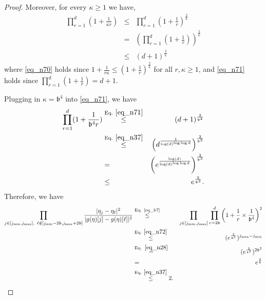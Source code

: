 \documentclass[11pt,letterpaper]{article}
\begin{document}
\begin{proof}
Moreover, for every $\kappa \geq 1$ we have,
%
\begin{eqnarray}
\prod_{r=1}^{d}   (1+ \frac{1}{\kappa r}) &\leq& \prod_{r=1}^{d}   (1+ \frac{1}{r})^{\frac{2}{\kappa}} \label{eq_n70}\\
%
&=& \left( \prod_{r=1}^{d}   (1+ \frac{1}{r}) \right)^{\frac{2}{\kappa}} \nonumber\\
%
&\leq& (d+1)^{\frac{2}{\kappa}} \label{eq_n71}
\end{eqnarray}
%
where \eqref{eq_n70} holds since $1+ \frac{1}{r \kappa} \leq (1 + \frac{1}{r})^{\frac{2}{\kappa}}$ for all $r, \kappa \geq 1$, and \eqref{eq_n71} holds since $\prod_{r=1}^{d}   (1+\frac{1}{r}) = d+1$.

Plugging in $\kappa = \mathfrak{b}^4$ into \eqref{eq_n71}, we have
%
\begin{eqnarray}\label{eq_n72}
\prod_{r=1}^{d}   (1+ \frac{1}{\mathfrak{b}^4 r})
%
 &\stackrel{\textrm{Eq. } \eqref{eq_n71}}{\leq}& (d+1)^{\frac{2}{\mathfrak{b}^4}} \nonumber\\
%
&\stackrel{\textrm{Eq. } \eqref{eq_n37}}{\leq}& \left(d^{\frac{1}{\log(d)^{\log \log d}}}\right)^{\frac{2}{\mathfrak{b}^3}}  \nonumber\\
%
&=&\left(e^{\frac{\log(d)}{\log(d)^{\log \log d}}}\right)^{\frac{2}{\mathfrak{b}^3}}  \nonumber\\
 &\leq& e^{\frac{2}{\mathfrak{b}^3}}.
\end{eqnarray}
Therefore, we have 
%
\begin{eqnarray} 
\prod_{j \in [j_{\mathrm{min}} , j_{\mathrm{max}}] , \, \, \, \ell \notin [j_{\mathrm{min}} - 2\mathfrak{b} , j_{\mathrm{max}} + 2\mathfrak{b}]} \frac{| \eta_{j} - \eta_\ell|^2}{| g(\eta)[j] - g(\eta)[\ell]|^2}  &\stackrel{\textrm{Eq.  \eqref{eq_b7}}}{\leq}& \prod_{j \in [j_{\mathrm{min}} , j_{\mathrm{max}}]} \prod_{r = 2 \mathfrak{b}}^d \left(1+ \frac{1}{r} \times \frac{1}{\mathfrak{b}^4}\right)^2  \nonumber\\
%
&\stackrel{\textrm{Eq. } \eqref{eq_n72}}{\leq} & (e^{\frac{2}{\mathfrak{b}^3}})^{ j_{\mathrm{max}} -  j_{\mathrm{min}}} \nonumber\\
%
&\stackrel{\textrm{Eq. } \, \eqref{eq_n28}}{=}& (e^{\frac{2}{\mathfrak{b}^3}})^{2 \mathfrak{b}^2} \nonumber\\
%
& = & e^{\frac{4}{\mathfrak{b}}} \nonumber\\
%
& \stackrel{\textrm{Eq. } \eqref{eq_n37}}{\leq} 2\nonumber.
\end{eqnarray}
%
\end{proof}
\end{document}
